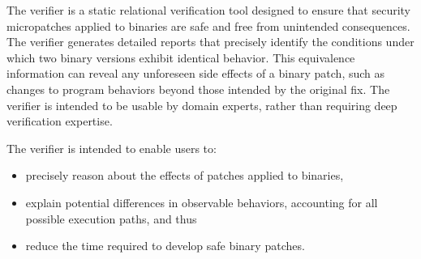 The \pate{} verifier is a static relational verification tool designed to ensure that security micropatches applied to binaries are safe and free from unintended consequences.
The verifier generates detailed reports that precisely identify the conditions under which two binary versions exhibit identical behavior.
This equivalence information can reveal any unforeseen side effects of a binary patch, such as changes to program behaviors beyond those intended by the original fix.
The verifier is intended to be usable by domain experts, rather than requiring deep verification expertise.

The verifier is intended to enable users to:
\begin{itemize}
\item precisely reason about the effects of patches applied to binaries,
\item explain potential differences in observable behaviors, accounting for all possible execution paths, and thus
\item reduce the time required to develop safe binary patches.
\end{itemize}

\vspace{0.25in}
